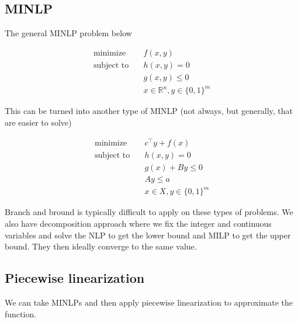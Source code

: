 \subsection{MINLP}
The general MINLP problem below

\begin{align}
  \text{minimize} & \quad f(x,y) \\
  \text{subject to} & \quad h(x,y) = 0 \\
  & \quad g(x,y) \leq 0 \\
  & \quad x \in \mathbb{R}^n, y \in \{ 0,1 \}^m
\end{align}

This can be turned into another type of MINLP (not always, but generally, that are easier to solve)

\begin{align}
  \text{minimize} & \quad c^\top y + f(x) \\
  \text{subject to} & \quad h(x,y) = 0 \\
  & \quad g(x) + By \leq 0 \\
  & \quad Ay \leq a \\
  & \quad x \in X, y \in \{ 0,1 \}^m
\end{align}

Branch and bround is typically difficult to apply on these types of problems.
We also have decomposition approach where we fix the integer and continuous variables and solve the NLP to get the lower bound and MILP to get the upper bound.
They then ideally converge to the same value.

\subsection{Piecewise linearization}
We can take MINLPs and then apply piecewise linearization to approximate the function.